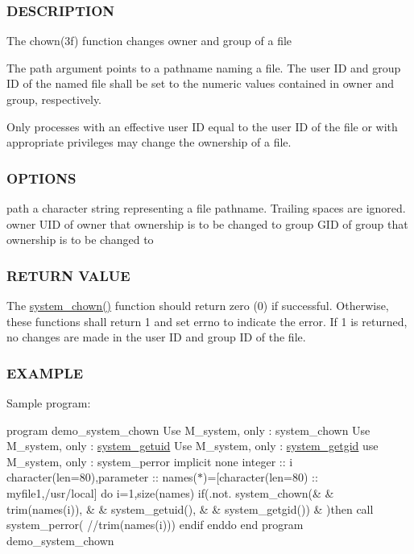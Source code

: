 \subsubsection*{D\+E\+S\+C\+R\+I\+P\+T\+I\+ON}

The chown(3f) function changes owner and group of a file

The path argument points to a pathname naming a file. The user ID and group ID of the named file shall be set to the numeric values contained in owner and group, respectively.

Only processes with an effective user ID equal to the user ID of the file or with appropriate privileges may change the ownership of a file.

\subsubsection*{O\+P\+T\+I\+O\+NS}

path a character string representing a file pathname. Trailing spaces are ignored. owner U\+ID of owner that ownership is to be changed to group G\+ID of group that ownership is to be changed to

\subsubsection*{R\+E\+T\+U\+RN V\+A\+L\+UE}

The \mbox{\hyperlink{namespacem__system_a3353c1cff032fcfe2985a69f10038ddd}{system\+\_\+chown()}} function should return zero (0) if successful. Otherwise, these functions shall return 1 and set errno to indicate the error. If 1 is returned, no changes are made in the user ID and group ID of the file.

\subsubsection*{E\+X\+A\+M\+P\+LE}

Sample program\+:

program demo\+\_\+system\+\_\+chown Use M\+\_\+system, only \+: system\+\_\+chown Use M\+\_\+system, only \+: \mbox{\hyperlink{interfacem__system_1_1system__getuid}{system\+\_\+getuid}} Use M\+\_\+system, only \+: \mbox{\hyperlink{interfacem__system_1_1system__getgid}{system\+\_\+getgid}} use M\+\_\+system, only \+: system\+\_\+perror implicit none integer \+:\+: i character(len=80),parameter \+:\+: names($\ast$)=\mbox{[}character(len=80) \+:\+: \textquotesingle{}myfile1\textquotesingle{},\textquotesingle{}/usr/local\textquotesingle{}\mbox{]} do i=1,size(names) if(.not. system\+\_\+chown(\& \& trim(names(i)), \& \& system\+\_\+getuid(), \& \& system\+\_\+getgid()) \& )then call system\+\_\+perror( \textquotesingle{}//trim(names(i))) endif enddo end program demo\+\_\+system\+\_\+chown 

